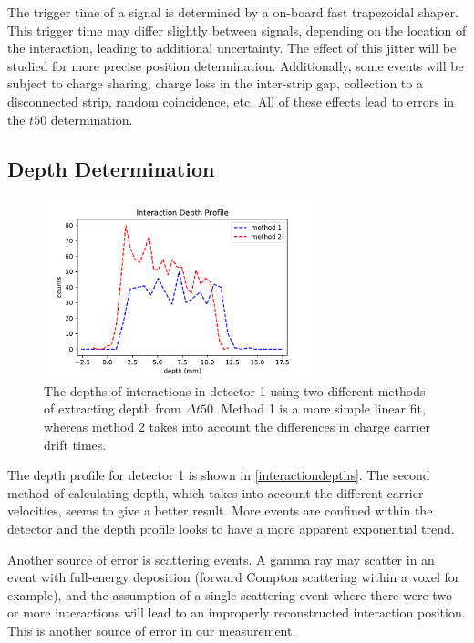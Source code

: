 The trigger time of a signal is determined by a on-board fast trapezoidal shaper. This trigger time may differ slightly between signals, depending on the location of the interaction, leading to additional uncertainty. The effect of this jitter will be studied for more precise position determination. Additionally, some events will be subject to charge sharing, charge loss in the inter-strip gap, collection to a disconnected strip, random coincidence, etc. All of these effects lead to errors in the $t50$ determination.

\subsection*{Depth Determination}

\begin{figure}
\begin{centering}
\includegraphics[width=0.7\textwidth]{./figures/interactiondepths.pdf}
\caption{The depths of interactions in detector 1 using two different methods of extracting depth from $\Delta t50$. Method 1 is a more simple linear fit, whereas method 2 takes into account the differences in charge carrier drift times.}
\label{depths}
\end{centering}
\end{figure}

The depth profile for detector 1 is shown in \ref{interactiondepths}. The second method of calculating depth, which takes into account the different carrier velocities, seems to give a better result. More events are confined within the detector and the depth profile looks to have a more apparent exponential trend.

Another source of error is scattering events. A gamma ray may scatter in an event with full-energy deposition (forward Compton scattering within a voxel for example), and the assumption of a single scattering event where there were two or more interactions will lead to an improperly reconstructed interaction position. This is another source of error in our measurement.

